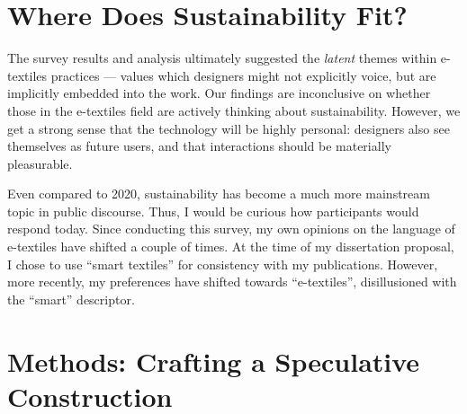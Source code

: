 
\section{Where Does Sustainability Fit?}

The survey results and analysis ultimately suggested the \textit{latent} themes within e-textiles practices \cite{corbin_grounded_1990} --- values which designers might not explicitly voice, but are implicitly embedded into the work. Our findings are inconclusive on whether those in the e-textiles field are actively thinking about sustainability. However, we get a strong sense that the technology will be highly personal: designers also see themselves as future users, and that interactions should be materially pleasurable. 

Even compared to 2020, sustainability has become a much more mainstream topic in public discourse. Thus, I would be curious how participants would respond today.
Since conducting this survey, my own opinions on the language of e-textiles have shifted a couple of times. At the time of my dissertation proposal, I chose to use ``smart textiles'' for consistency with my publications. However, more recently, my preferences have shifted towards ``e-textiles'', disillusioned with the ``smart'' descriptor.

\section{Methods: Crafting a Speculative Construction}

